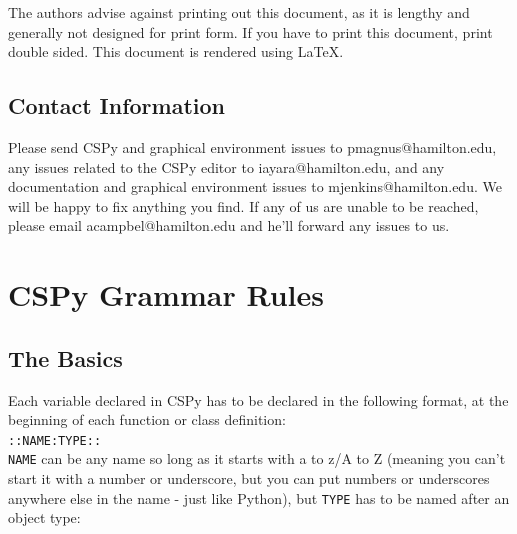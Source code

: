 \documentclass{article}
\begin{document}
The authors advise against printing out this document, as it is lengthy and generally not designed for print form. If you have to print this document, print double sided. This document is rendered using \LaTeX.

\subsection{Contact Information}
Please send CSPy and graphical environment issues to pmagnus@hamilton.edu, any issues related to the CSPy editor to iayara@hamilton.edu, and any documentation and graphical environment issues to mjenkins@hamilton.edu. We will be happy to fix anything you find. If any of us are unable to be reached, please email acampbel@hamilton.edu and he'll forward any issues to us.

\pagebreak

\section{CSPy Grammar Rules}
\subsection{The Basics}
Each variable declared in CSPy has to be declared in the following format, at the beginning of each function or class definition: \\

\verb|::NAME:TYPE::| \\

\verb|NAME| can be any name so long as it starts with a to z/A to Z (meaning you can't start it with a number or underscore, but you can put numbers or underscores anywhere else in the name - just like Python), but \verb|TYPE| has to be named after an object type:
\end{document}
